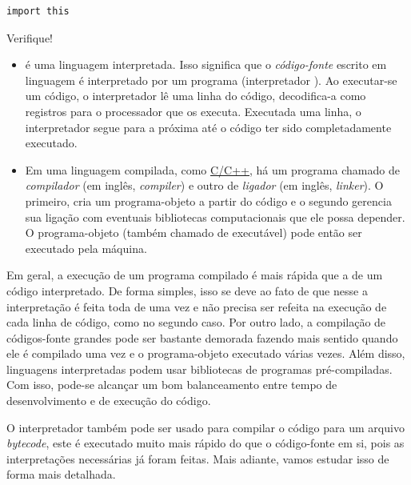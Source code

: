 \begin{lstlisting}
import this
\end{lstlisting}

Verifique!

\begin{itemize}
\item {}

  {\python} é uma linguagem interpretada. Isso significa que o \emph{código-fonte} escrito em linguagem {\python} é interpretado por um programa (interpretador {\python}). Ao executar-se um código, o interpretador lê uma linha do código, decodifica-a como registros para o processador que os executa. Executada uma linha, o interpretador segue para a próxima até o código ter sido completadamente executado.

\item {}

  Em uma linguagem compilada, como \href{https://pt.wikipedia.org/wiki/C\%2B\%2B}{C/C++}, há um programa chamado de \emph{compilador} (em inglês, \textit{compiler}) e outro de \emph{ligador} (em inglês, \textit{linker}). O primeiro, cria um programa-objeto a partir do código e o segundo gerencia sua ligação com eventuais bibliotecas computacionais que ele possa depender. O programa-objeto (também chamado de executável) pode então ser executado pela máquina.
\end{itemize}

Em geral, a execução de um programa compilado é mais rápida que a de um código interpretado. De forma simples, isso se deve ao fato de que nesse a interpretação é feita toda de uma vez e não precisa ser refeita na execução de cada linha de código, como no segundo caso. Por outro lado, a compilação de códigos-fonte grandes pode ser bastante demorada fazendo mais sentido quando ele é compilado uma vez e o programa-objeto executado várias vezes. Além disso, linguagens interpretadas podem usar bibliotecas de programas pré-compiladas. Com isso, pode-se alcançar um bom balanceamento entre tempo de desenvolvimento e de execução do código.

O interpretador {\python} também pode ser usado para compilar o código para um arquivo \emph{bytecode}, este é executado muito mais rápido do que o código-fonte em si, pois as interpretações necessárias já foram feitas. Mais adiante, vamos estudar isso de forma mais detalhada.

\ifisbook
\newpage
\fi

